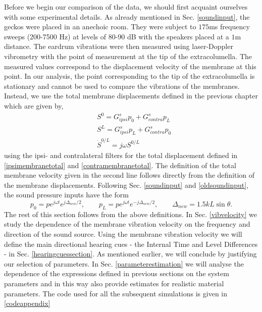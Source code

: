 Before we begin our comparison of the data, we should first acquaint ourselves with some experimental details. As already mentioned in Sec. \ref{soundinput}, the geckos were placed in
an anechoic room. They were subject to $175$ms frequency sweeps (200-7500 Hz) at levels of 80-90 dB with the speakers placed at
a $1$m distance. The eardrum vibrations were then measured using laser-Doppler vibrometry with the point
of measurement at the tip of the extracolumella. The measured values correspond to the displacement velocity of the membrane at this point.  
In our analysis, the point corresponding to the tip of the extracolumella is stationary and cannot be used to compare the vibrations of the membranes. 
Instead, we use the total membrane displacements defined in the previous chapter which are given by,
\begin{align}
 &S^0=G^s_{ipsi}p_0+G^s_{contra} p_L\\
 &S^L=G^s_{ipsi}p_L+G^s_{contra}p_0\\
 &\dot{S}^{0/L}=j\omega S^{0/L}\label{totalvelocity}
\end{align}
using the ipsi- and contralateral filters for the total displacement defined in \eqref{ipsimembranetotal} and \eqref{contramembranetotal}.
The definition of the total membrane velocity given in the second line follows directly from the definition of the membrane displacements. Following Sec. \ref{soundinput}
and \eqref{oldsoundinput}, the sound pressure inputs have the form
\begin{equation}\label{newsoundinput}
 p_0=pe^{j\omega t} e^{j\Delta_{new}/2},\qquad p_L=pe^{j\omega t} e^{-j\Delta_{new}/2},\qquad \Delta_{new}=1.5kL\sin\theta.
\end{equation}
The rest of this section follows from the above definitions. In Sec. \ref{vibvelocity} we study the dependence of the membrane vibration velocity 
on the frequency and direction of the sound source. Using the membrane vibration velocity we will define the main directional hearing cues
 - the Internal Time and Level Differences - in Sec. \ref{hearingcuessection}. As mentioned earlier, we will conclude by justifying our selection of parameters. In
Sec. \ref{parameterestimation} we will analyse the dependence of the expressions defined in previous sections on the system parameters 
and in this way also provide estimates for realistic material parameters.  The code used for all the subsequent simulations is given in \ref{codeappendix}

